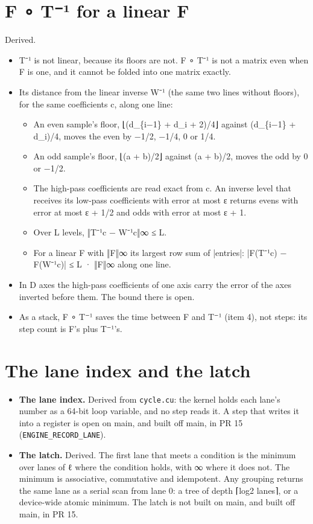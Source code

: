 \section{\texorpdfstring{F ∘ T⁻¹ for a linear F}{F ∘ T⁻¹ for a linear F}}

Derived.

\begin{itemize}
\item T⁻¹ is not linear, because its floors are not. F ∘ T⁻¹ is not a matrix even when F is one, and it cannot be folded into one matrix exactly.
\item Its distance from the linear inverse W⁻¹ (the same two lines without floors), for the same coefficients c, along one line:

\begin{itemize}
\item An even sample's floor, ⌊(d\_\allowbreak{}\{i−1\} + d\_\allowbreak{}i + 2)/4⌋ against (d\_\allowbreak{}\{i−1\} + d\_\allowbreak{}i)/4, moves the even by −1/2, −1/4, 0 or 1/4.
\item An odd sample's floor, ⌊(a + b)/2⌋ against (a + b)/2, moves the odd by 0 or −1/2.
\item The high-pass coefficients are read exact from c. An inverse level that receives its low-pass coefficients with error at most ε returns evens with error at most ε + 1/2 and odds with error at most ε + 1.
\item Over L levels, ‖T⁻¹c − W⁻¹c‖∞ ≤ L.
\item For a linear F with ‖F‖∞ its largest row sum of |entries|: |F(T⁻¹c) − F(W⁻¹c)| ≤ L · ‖F‖∞ along one line.
\end{itemize}
\item In D axes the high-pass coefficients of one axis carry the error of the axes inverted before them. The bound there is open.
\item As a stack, F ∘ T⁻¹ saves the time between F and T⁻¹ (item 4), not steps: its step count is F's plus T⁻¹'s.
\end{itemize}

\section{\texorpdfstring{The lane index and the latch}{The lane index and the latch}}

\begin{itemize}
\item \textbf{The lane index.} Derived from \texttt{cycle.\allowbreak{}cu}: the kernel holds each lane's number as a 64-bit loop variable, and no step reads it. A step that writes it into a register is open on main, and built off main, in PR 15 (\texttt{ENGINE\_\allowbreak{}RECORD\_\allowbreak{}LANE}).
\item \textbf{The latch.} Derived. The first lane that meets a condition is the minimum over lanes of ℓ where the condition holds, with ∞ where it does not. The minimum is associative, commutative and idempotent. Any grouping returns the same lane as a serial scan from lane 0: a tree of depth ⌈log2 lanes⌉, or a device-wide atomic minimum. The latch is not built on main, and built off main, in PR 15.
\end{itemize}

